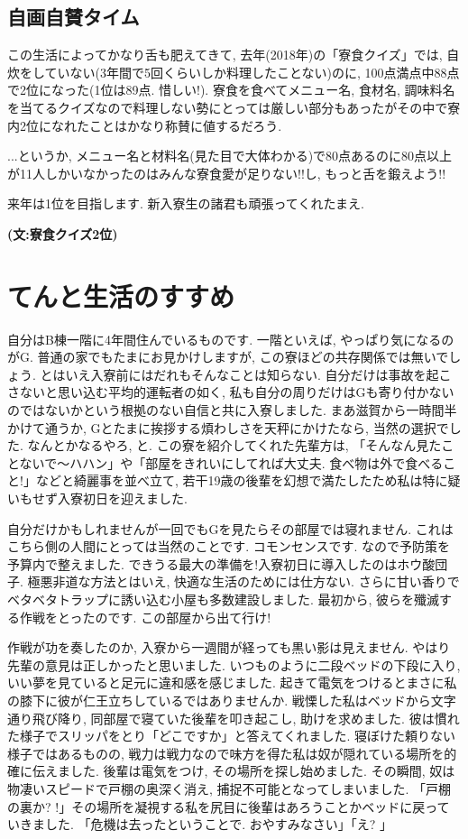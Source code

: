 \documentclass[10pt,b5jsbook,dvips,dvipdfmx,openany]{jsbook}
\theoremstyle{definition}
\begin{document}
		\subsection{自画自賛タイム}
		この生活によってかなり舌も肥えてきて, 去年(2018年)の「寮食クイズ」では, 自炊をしていない(3年間で5回くらいしか料理したことない)のに, 100点満点中88点で2位になった(1位は89点. 惜しい!). 寮食を食べてメニュー名, 食材名, 調味料名を当てるクイズなので料理しない勢にとっては厳しい部分もあったがその中で寮内2位になれたことはかなり称賛に値するだろう.

		...というか, メニュー名と材料名(見た目で大体わかる)で80点あるのに80点以上が11人しかいなかったのはみんな寮食愛が足りない!!し, もっと舌を鍛えよう!!

		来年は1位を目指します. 新入寮生の諸君も頑張ってくれたまえ.

{\bf (文:寮食クイズ2位)}

    \section{てんと生活のすすめ}

    自分はB棟一階に4年間住んでいるものです. 一階といえば, やっぱり気になるのがG.
    普通の家でもたまにお見かけしますが, この寮ほどの共存関係では無いでしょう.
    とはいえ入寮前にはだれもそんなことは知らない.
    自分だけは事故を起こさないと思い込む平均的運転者の如く, 私も自分の周りだけはGも寄り付かないのではないかという根拠のない自信と共に入寮しました. まあ滋賀から一時間半かけて通うか, Gとたまに挨拶する煩わしさを天秤にかけたなら, 当然の選択でした. なんとかなるやろ, と.
    この寮を紹介してくれた先輩方は, 「そんなん見たことないで〜ハハン」や「部屋をきれいにしてれば大丈夫. 食べ物は外で食べること!」などと綺麗事を並べ立て, 若干19歳の後輩を幻想で満たしたため私は特に疑いもせず入寮初日を迎えました.

    自分だけかもしれませんが一回でもGを見たらその部屋では寝れません. これはこちら側の人間にとっては当然のことです. コモンセンスです. なので予防策を予算内で整えました. できうる最大の準備を!入寮初日に導入したのはホウ酸団子. 極悪非道な方法とはいえ, 快適な生活のためには仕方ない. さらに甘い香りでベタベタトラップに誘い込む小屋も多数建設しました. 最初から, 彼らを殲滅する作戦をとったのです. この部屋から出て行け!

    作戦が功を奏したのか, 入寮から一週間が経っても黒い影は見えません. やはり先輩の意見は正しかったと思いました. いつものように二段ベッドの下段に入り, いい夢を見ていると足元に違和感を感じました. 起きて電気をつけるとまさに私の膝下に彼が仁王立ちしているではありませんか. 戦慄した私はベッドから文字通り飛び降り, 同部屋で寝ていた後輩を叩き起こし, 助けを求めました. 彼は慣れた様子でスリッパをとり「どこですか」と答えてくれました. 寝ぼけた頼りない様子ではあるものの, 戦力は戦力なので味方を得た私は奴が隠れている場所を的確に伝えました. 後輩は電気をつけ, その場所を探し始めました. その瞬間, 奴は物凄いスピードで戸棚の奥深く消え, 捕捉不可能となってしまいました. 「戸棚の裏か? !」その場所を凝視する私を尻目に後輩はあろうことかベッドに戻っていきました. 「危機は去ったということで. おやすみなさい」「え? 」
\end{document}
